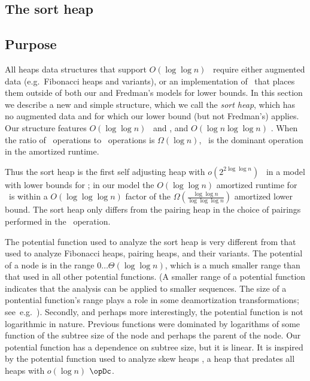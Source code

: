 \begin{fullonly}
\section{The sort heap}

\subsection{Purpose}

All heaps data structures that support $O(\log \log n)$ \opDc\ require either augmented data (e.g.~Fibonacci heaps and variants), or 
an implementation of \opDc\ that places them outside of both our and Fredman's \cite{DBLP:journals/jacm/Fredman99} models for lower bounds. In this section we describe a new and simple structure, which we call the \emph{sort heap}, which has no augmented data and for which our lower bound (but not Fredman's) applies. 
Our structure features $O(\log \log n)$ \opIns\ and \opDc, and $O(\log n \log \log n)$ \opEm.
When the ratio of \opDc\ operations to \opEm\ operations is $\Omega(\log n)$, \opDc\ is the dominant operation in the amortized runtime.

Thus the sort heap is the first self adjusting heap with $o(2^{2 \log \log n})$ \opDc\ in a model with lower bounds for \opDc; 
in our model the $O(\log \log n)$ amortized runtime for \opDc\ is within a $O(\log \log \log n)$ factor of the
$\Omega \left( \frac{\log \log n}{\log \log \log n} \right)$ amortized lower bound.
The sort heap only differs from the pairing heap in the choice of pairings performed in the \opEm\ operation.


The potential function used to analyze the sort heap is very different from that used to analyze Fibonacci heaps, pairing heaps, and their variants. The potential of a node is in the range $0 \ldots \Theta(\log \log n)$, which is a much smaller range than that used in all other potential functions. 
(A smaller range of a potential function indicates that the analysis can be applied to smaller sequences. The size of
a pontential function's range plays a role in some deamortization transformations; see~e.g.~\cite{DBLP:conf/icalp/BoseCFL12}).
Secondly, and perhaps more interestingly, the potential function is not logarithmic in nature. Previous functions were dominated by logarithms of some function of the subtree size of the node and perhaps the parent of the node. Our potential function has a dependence on subtree size, but it is linear. It is inspired by  the potential function used to analyze skew heaps \cite{DBLP:journals/jacm/SleatorT85}, a heap that predates all heaps with $o(\log n)$ $\opDc$. 


\end{fullonly}
